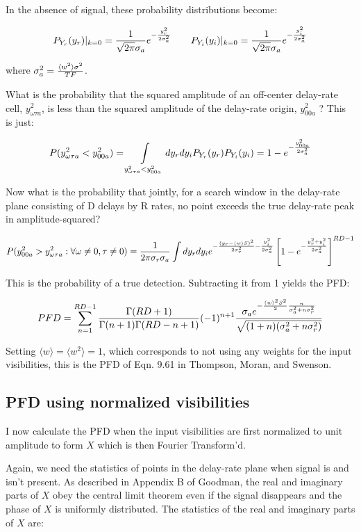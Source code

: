 In the absence of signal, these probability distributions become:

$$P_{Y_r}(y_r)|_{k=0} = {1\over\sqrt{2\pi}\sigma_a}
                  e^{-{y_r^2\over2\sigma_a^2}} \qquad
  P_{Y_i}(y_i)|_{k=0} = {1\over\sqrt{2\pi}\sigma_a}
                  e^{-{y_i^2\over2\sigma_a^2}}$$

where $\sigma_a^2 = {\langle w^2\rangle \sigma^2\over TF}$.

What is the probability that the squared amplitude of an off-center
delay-rate cell, $y_{\omega\tau a}^2$, is less than the squared
amplitude of the delay-rate origin, $y_{00a}^2$ ?  This is just:

$$P(y_{\omega\tau a}^2 < y_{00a}^2)
= \int\limits_{y_{\omega\tau a}^2 < y_{00a}^2}dy_rdy_iP_{Y_r}(y_r)P_{Y_i}(y_i)
= 1 - e^{-{y_{00a}^2\over2\sigma_a^2}}$$

Now what is the probability that jointly, for a search window in the
delay-rate plane consisting of D delays by R rates, no point exceeds
the true delay-rate peak in amplitude-squared?

$$P(y_{00a}^2 > y^2_{\omega\tau a}: \forall \omega\neq0, \tau\neq0 )
= {1\over2\pi\sigma_r\sigma_a} \int dy_rdy_i
  e^{-{(y_r - \langle w\rangle S)^2\over2\sigma_r^2}-{y_i^2\over2\sigma_a^2}}
  \left[1 - e^{-{y_r^2+y_i^2\over2\sigma_a^2}}\right]^{RD-1}$$

This is the probability of a true detection.  Subtracting it from 1
yields the PFD:


$$PFD= \sum\limits_{n=1}^{RD-1}{\Gamma(RD+1)\over\Gamma(n+1)\Gamma(RD-n+1)}(-1)^{n+1}
  {\sigma_ae^{-{\langle w\rangle^2S^2\over2}{n\over\sigma_a^2+n\sigma_r^2}}\over\sqrt{(1+n)(\sigma_a^2+n\sigma_r^2)}}$$

Setting $\langle w\rangle = \langle w^2\rangle = 1$, which corresponds
to not using any weights for the input visibilities, this is the PFD
of Eqn. 9.61 in Thompson, Moran, and Swenson.

\subsection{PFD using normalized visibilities}

I now calculate the PFD when the input visibilities are first
normalized to unit amplitude to form $X$ which is then Fourier
Transform'd.

Again, we need the statistics of points in the delay-rate plane when
signal is and isn't present.  As described in Appendix B of Goodman,
the real and imaginary parts of $X$ obey the central limit theorem
even if the signal disappears and the phase of $X$ is uniformly
distributed.  The statistics of the real and imaginary parts of $X$
are:


